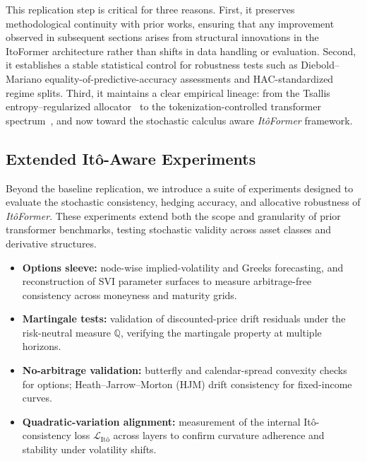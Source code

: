 \documentclass[10pt,twocolumn]{article}
\begin{document}
This replication step is critical for three reasons. First, it preserves methodological continuity with prior works, ensuring that any improvement observed in subsequent sections arises from structural innovations in the ItoFormer architecture rather than shifts in data handling or evaluation. Second, it establishes a stable statistical control for robustness tests such as Diebold–Mariano equality-of-predictive-accuracy assessments and HAC-standardized regime splits. Third, it maintains a clear empirical lineage: from the Tsallis entropy–regularized allocator~\cite{coulter2025neural} to the tokenization-controlled transformer spectrum~\cite{coulter2025tokenization}, and now toward the stochastic calculus aware \emph{It\^oFormer} framework.\\

\subsection{Extended It\^o-Aware Experiments}

Beyond the baseline replication, we introduce a suite of experiments designed to evaluate the stochastic consistency, hedging accuracy, and allocative robustness of \emph{It\^oFormer}. These experiments extend both the scope and granularity of prior transformer benchmarks, testing stochastic validity across asset classes and derivative structures.

\begin{itemize}
  \item \textbf{Options sleeve:} node-wise implied-volatility and Greeks forecasting, and reconstruction of SVI parameter surfaces to measure arbitrage-free consistency across moneyness and maturity grids.
  \item \textbf{Martingale tests:} validation of discounted-price drift residuals under the risk-neutral measure $\mathbb Q$, verifying the martingale property at multiple horizons.
  \item \textbf{No-arbitrage validation:} butterfly and calendar-spread convexity checks for options; Heath–Jarrow–Morton (HJM) drift consistency for fixed-income curves.
  \item \textbf{Quadratic-variation alignment:} measurement of the internal It\^o-consistency loss $\mathcal{L}_{\text{It\^o}}$ across layers to confirm curvature adherence and stability under volatility shifts.
\end{itemize}
\end{document}
